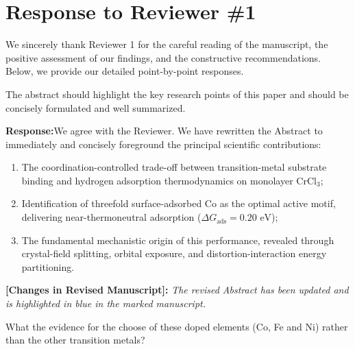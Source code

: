 \documentclass[11pt, sans, a4paper]{moderncv}
\newcommand{\response}{\vspace{0.4em}\noindent\textbf{\color{actionblue}Response:}\hspace{0.5em}}
\newcommand{\manuscriptchange}[1]{\vspace{0.3em}\noindent\textbf{\color{acsblue}[Changes in Revised Manuscript]:} \textit{#1}\vspace{0.4em}}
\begin{document}
\newpage

\section{Response to Reviewer \#1}

\noindent We sincerely thank Reviewer 1 for the careful reading of the manuscript, the positive assessment of our findings, and the constructive recommendations. Below, we provide our detailed point-by-point responses.

\begin{reviewercomment}
The abstract should highlight the key research points of this paper and should be concisely formulated and well summarized.
\end{reviewercomment}

\response We agree with the Reviewer. We have rewritten the Abstract to immediately and concisely foreground the principal scientific contributions:
\begin{enumerate}[leftmargin=1.5em, itemsep=0.2em]
    \item The coordination-controlled trade-off between transition-metal substrate binding and hydrogen adsorption thermodynamics on monolayer $\text{CrCl}_3$;
    \item Identification of threefold surface-adsorbed Co as the optimal active motif, delivering near-thermoneutral adsorption ($\Delta G_{\mathrm{ads}} = 0.20\text{ eV}$);
    \item The fundamental mechanistic origin of this performance, revealed through crystal-field splitting, orbital exposure, and distortion-interaction energy partitioning.
\end{enumerate}

\manuscriptchange{The revised Abstract has been updated and is highlighted in blue in the marked manuscript.}

\begin{reviewercomment}
What the evidence for the choose of these doped elements (Co, Fe and Ni) rather than the other transition metals?
\end{reviewercomment}
\end{document}

